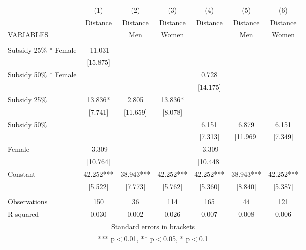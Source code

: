 \begin{tabular}{lcccccc} \hline
 & (1) & (2) & (3) & (4) & (5) & (6) \\
 & Distance & Distance & Distance & Distance & Distance & Distance \\
VARIABLES &  & Men & Women &  & Men & Women \\ \hline
 &  &  &  &  &  &  \\
Subsidy 25\% * Female & -11.031 &  &  &  &  &  \\
 & [15.875] &  &  &  &  &  \\
Subsidy 50\% * Female &  &  &  & 0.728 &  &  \\
 &  &  &  & [14.175] &  &  \\
Subsidy 25\% & 13.836* & 2.805 & 13.836* &  &  &  \\
 & [7.741] & [11.659] & [8.078] &  &  &  \\
Subsidy 50\% &  &  &  & 6.151 & 6.879 & 6.151 \\
 &  &  &  & [7.313] & [11.969] & [7.349] \\
Female & -3.309 &  &  & -3.309 &  &  \\
 & [10.764] &  &  & [10.448] &  &  \\
Constant & 42.252*** & 38.943*** & 42.252*** & 42.252*** & 38.943*** & 42.252*** \\
 & [5.522] & [7.773] & [5.762] & [5.360] & [8.840] & [5.387] \\
 &  &  &  &  &  &  \\
Observations & 150 & 36 & 114 & 165 & 44 & 121 \\
 R-squared & 0.030 & 0.002 & 0.026 & 0.007 & 0.008 & 0.006 \\ \hline
\multicolumn{7}{c}{ Standard errors in brackets} \\
\multicolumn{7}{c}{ *** p$<$0.01, ** p$<$0.05, * p$<$0.1} \\
\end{tabular}
